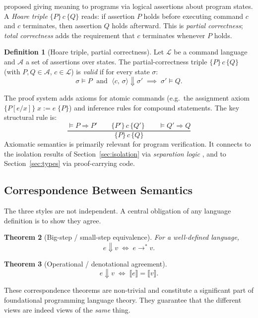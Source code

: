 \documentclass[11pt, a4paper]{article}
\theoremstyle{definition}
\newtheorem{definition}{Definition}[section]
\theoremstyle{plain}
\newtheorem{theorem}[definition]{Theorem}
\theoremstyle{remark}
\begin{document}
\citet{hoare1969} proposed giving meaning to programs via logical
assertions about program states.  A \emph{Hoare triple}
$\{P\}\, c\, \{Q\}$ reads: if assertion $P$ holds before executing
command $c$ and $c$ terminates, then assertion $Q$ holds afterward.
This is \emph{partial correctness}; \emph{total correctness} adds
the requirement that $c$ terminates whenever $P$ holds.

\begin{definition}[Hoare triple, partial correctness]
  Let $\mathcal{L}$ be a command language and $\mathcal{A}$ a set of
  assertions over states.  The partial-correctness triple
  $\{P\}\,c\,\{Q\}$ (with $P, Q \in \mathcal{A}$, $c \in \mathcal{L}$)
  is \emph{valid} if for every state $\sigma$:
  \[
    \sigma \models P
    \;\text{ and }\;
    \langle c,\, \sigma \rangle \Downarrow \sigma'
    \;\implies\;
    \sigma' \models Q.
  \]
\end{definition}

The proof system adds axioms for atomic commands (e.g.\ the assignment
axiom $\{P[e/x]\}\; x := e \;\{P\}$) and inference rules for
compound statements.  The key structural rule is:
\[
  \frac{\models P \Rightarrow P' \qquad \{P'\}\,c\,\{Q'\} \qquad \models Q' \Rightarrow Q}
       {\{P\}\,c\,\{Q\}}
  \tag{Consequence}
\]
Axiomatic semantics is primarily relevant for program verification.
It connects to the isolation results of Section~\ref{sec:isolation}
via \emph{separation logic} \citep{reynolds2002,ohearn2001}, and to
Section~\ref{sec:types} via proof-carrying code.

\subsection{Correspondence Between Semantics}

The three styles are not independent. A central obligation of any language
definition is to show they agree.

\begin{theorem}[Big-step / small-step equivalence]
  For a well-defined language,
  \[
    e \Downarrow v \;\iff\; e \to^{*} v.
  \]
\end{theorem}

\begin{theorem}[Operational / denotational agreement]
  \[
    e \Downarrow v \;\iff\; \llbracket e \rrbracket = \llbracket v \rrbracket.
  \]
\end{theorem}

These correspondence theorems are non-trivial and constitute a significant
part of foundational programming language theory. They guarantee that the
different views are indeed views of the \emph{same} thing.
\end{document}

